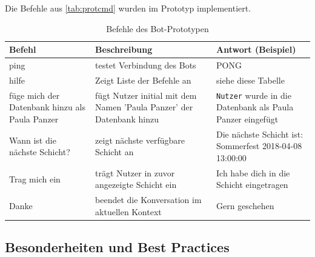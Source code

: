 Die Befehle aus \autoref{tab:protcmd} wurden im Prototyp implementiert.

\begin{table}[h!]
    \centering
    \begin{tabularx}{\textwidth}{|X|X|X|}
        \hline
        \textbf{Befehl} & \textbf{Beschreibung} & \textbf{Antwort} (Beispiel) \\
        \hline
        ping & testet Verbindung des Bots & PONG \\
        \hline
        hilfe & Zeigt Liste der Befehle an & siehe diese Tabelle \\
        \hline
        füge mich der Datenbank hinzu als Paula Panzer & fügt Nutzer initial mit dem Namen 'Paula Panzer' der Datenbank hinzu & \texttt{Nutzer} wurde in die Datenbank als Paula Panzer eingefügt \\
        \hline
        Wann ist die nächste Schicht? & zeigt nächste verfügbare Schicht an & Die nächste Schicht ist: Sommerfest 2018-04-08 13:00:00 \\
        \hline
        Trag mich ein & trägt Nutzer in zuvor angezeigte Schicht ein & Ich habe dich in die Schicht eingetragen \\
        \hline
        Danke & beendet die Konversation im aktuellen Kontext & Gern geschehen \\
        \hline
    \end{tabularx}
    \caption{Befehle des Bot-Prototypen}
    \label{tab:protcmd}
\end{table}


\subsection{Besonderheiten und Best Practices}

